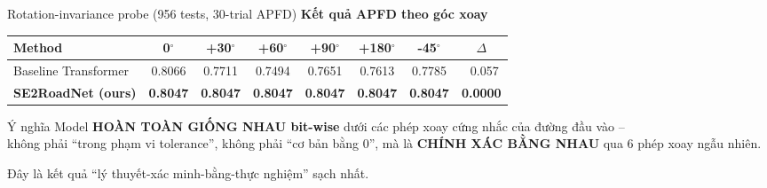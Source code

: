 \documentclass[aspectratio=169,10pt]{beamer}
\begin{document}
\begin{frame}{Rotation-invariance probe (956 tests, 30-trial APFD)}
\centering
\textbf{Kết quả APFD theo góc xoay}\\[0.5em]

\scriptsize
\begin{tabular}{l c c c c c c c}
  \toprule
  \textbf{Method} & 0$^\circ$ & +30$^\circ$ & +60$^\circ$ & +90$^\circ$ & +180$^\circ$ & -45$^\circ$ & \textbf{$\Delta$} \\
  \midrule
  Baseline Transformer & 0.8066 & 0.7711 & 0.7494 & 0.7651 & 0.7613 & 0.7785 & \textcolor{alert}{~0.057} \\
  \rowcolor{success!15}
  \textbf{SE2RoadNet (ours)} & \textbf{0.8047} & \textbf{0.8047} & \textbf{0.8047} & \textbf{0.8047} & \textbf{0.8047} & \textbf{0.8047} & \cellcolor{success!25}\textbf{0.0000} \\
  \bottomrule
\end{tabular}

\vspace{0.8em}
\begin{block}{Ý nghĩa}
\scriptsize
Model \textbf{HOÀN TOÀN GIỐNG NHAU bit-wise} dưới các phép xoay cứng nhắc của đường đầu vào --\\
không phải ``trong phạm vi tolerance'', không phải ``cơ bản bằng 0'', mà là \textbf{CHÍNH XÁC BẰNG NHAU} qua 6 phép xoay ngẫu nhiên.
\end{block}

\begin{block}{Đây là kết quả ``lý thuyết-xác minh-bằng-thực nghiệm'' sạch nhất.}
\end{block}
\end{frame}
\end{document}
